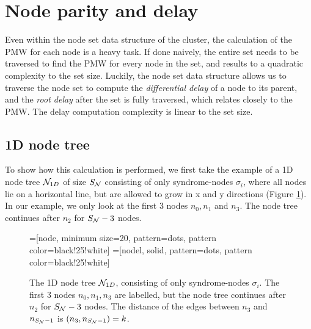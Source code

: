 \section{Node parity and delay}\label{sec:nodedelay}

Even within the node set data structure of the cluster, the calculation of the PMW for each node is a heavy task. If done naively, the entire set needs to be traversed to find the PMW for every node in the set, and results to a quadratic complexity to the set size. Luckily, the node set data structure allows us to traverse the node set to compute the \emph{differential delay} of a node to its parent, and the \emph{root delay} after the set is fully traversed, which relates closely to the PMW. The delay computation complexity is linear to the set size.

\subsection{1D node tree}
To show how this calculation is performed, we first take the example of a 1D node tree $\mathcal{N}_{1D}$ of size $S_{\mathcal{N}}$ consisting of only syndrome-nodes $\sigma_i$, where all nodes lie on a horizontal line, but are allowed to grow in x and y directions (Figure \ref{fig:1dnodetree}). In our example, we only look at the first 3 nodes $n_0, n_1$ and $n_3$. The node tree continues after $n_2$ for $S_{\mathcal{N}} - 3$ nodes.

\begin{figure}
  \centering
  =[node, minimum size=20, pattern=dots, pattern color=black!25!white]
  =[nodel, solid, pattern=dots, pattern color=black!25!white]
  \caption{The 1D node tree $\mathcal{N}_{1D}$, consisting of only syndrome-nodes $\sigma_i$. The first 3 nodes $n_0, n_1, n_3$ are labelled, but the node tree continues after $n_2$ for $S_{\mathcal{N}} - 3$ nodes. The distance of the edges between $n_3$ and $n_{S_{\mathcal{N}}-1}$ is $(n_3, n_{S_{\mathcal{N}}-1})=k$.}\label{fig:1dnodetree}
\end{figure}

